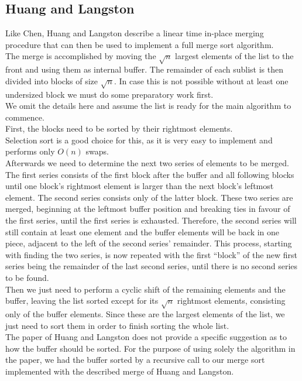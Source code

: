 \documentclass[11pt,pdftex,a4paper, twocolumn]{article}
\begin{document}
\subsection*{Huang and Langston}
Like Chen, Huang and Langston describe a linear time in-place merging procedure that can then be used to implement a full merge sort algorithm. \\
The merge is accomplished by moving the $\sqrt{n}$ largest elements of the list to the front and using them as internal buffer.
The remainder of each sublist is then divided into blocks of size $\sqrt{n}$. In case this is not possible without at least one undersized block we must do some preparatory work first. \\
We omit the details here and assume the list is ready for the main algorithm to commence. \\
First, the blocks need to be sorted by their rightmost elements. \\
Selection sort is a good choice for this, as it is very easy to implement and performs only $O(n)$ swaps. \\
$ $ \\
Afterwards we need to determine the next two series of elements to be merged. \\
The first series consists of the first block after the buffer and all following blocks until one block’s rightmost element is larger than the next block’s leftmost element. The second series consists only of the latter block. These two series are merged, beginning at the leftmost buffer position and breaking ties in favour of the first series, until the first series is exhausted. Therefore, the second series will still contain at least one element and the buffer elements will be back in one piece, adjacent to the left of the second series’ remainder.
This process, starting with finding the two series, is now repeated with the first “block” of the new first series being the remainder of the last second series, until there is no second series to be found. \\
$ $ \\
Then we just need to perform a cyclic shift of the remaining elements and the buffer, leaving the list sorted except for its $\sqrt{n}$ rightmost elements, consisting only of the buffer elements. Since these are the largest elements of the list, we just need to sort them in order to finish sorting the whole list. \\
The paper of Huang and Langston does not provide a specific suggestion as to how the buffer should be sorted. For the purpose of using solely the algorithm in the paper, we had the buffer sorted by a recursive call to our merge sort implemented with the described merge of Huang and Langston. \\
\end{document}
